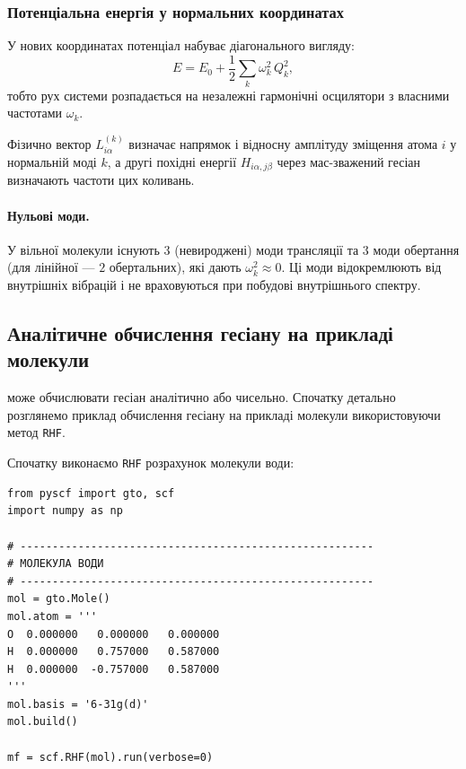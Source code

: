 \subsubsection{Потенціальна енергія у нормальних координатах}

У нових координатах потенціал набуває діагонального вигляду:
\begin{equation*}
    E = E_0 + \frac{1}{2}
    \sum_k \omega_k^2\, Q_k^2,
\end{equation*}
тобто рух системи розпадається на
незалежні гармонічні осцилятори
з власними частотами $\omega_k$.

Фізично вектор $L_{i\alpha}^{(k)}$ визначає
напрямок і відносну амплітуду зміщення атома $i$
у нормальній моді $k$,
а другі похідні енергії $H_{i\alpha, j\beta}$
через мас-зважений гесіан визначають частоти цих коливань.


\paragraph{Нульові моди.}
У вільної молекули існують $3$ (невироджені) моди трансляції та $3$ моди обертання (для лінійної — $2$ обертальних),
які дають \(\omega_k^2\approx 0\). Ці моди відокремлюють від внутрішніх вібрацій і не враховуються при побудові внутрішнього спектру.




\subsection{Аналітичне обчислення гесіану на прикладі молекули }

\PySCF{} може обчислювати гесіан аналітично або чисельно. Спочатку детально розглянемо приклад обчислення гесіану  на прикладі молекули  використовуючи метод \texttt{RHF}.

Спочатку виконаємо \texttt{RHF} розрахунок молекули води:

\begin{verbatim}
from pyscf import gto, scf
import numpy as np

# -------------------------------------------------------
# МОЛЕКУЛА ВОДИ
# -------------------------------------------------------
mol = gto.Mole()
mol.atom = '''
O  0.000000   0.000000   0.000000
H  0.000000   0.757000   0.587000
H  0.000000  -0.757000   0.587000
'''
mol.basis = '6-31g(d)'
mol.build()

mf = scf.RHF(mol).run(verbose=0)

\end{verbatim}



